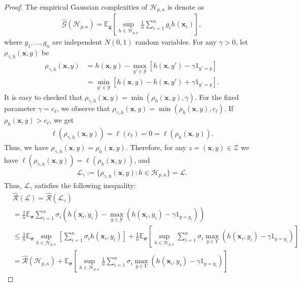 \documentclass{article}
\begin{document}
\begin{proof}
The empirical Gaussian complexities of $\mathcal{H}_{p,\kappa}$ is denote as
\begin{align*}
  \hat{\mathcal{G}}(\mathcal{H}_{p,\kappa})=\mathbb{E}_{\bm g}\left[\sup_{h\in \mathcal{H}_{p,\kappa}}\frac{1}{n}\sum_{i=1}^ng_{i}h(\mathbf x_i)\right],
\end{align*}
where $g_1,\ldots, g_n$ are independent $N(0,1)$ random variables.
For any $\gamma>0$, let  $\rho_{\gamma,h}(\mathbf x,y)$ be
  \begin{align*}
    \rho_{\gamma,h}(\mathbf x,y)&=h(\mathbf x,y)-\max_{y'\in\mathcal{Y}}[h(\mathbf x,y')-\gamma1_{y'=y}]\\
    &=\min_{y'\in\mathcal{Y}}[h(\mathbf x,y)-h(\mathbf x,y')+\gamma1_{y'=y}].
  \end{align*}
  It is easy to checked that $\rho_{\gamma,h}(\mathbf x,y)=\min(\rho_h(\mathbf x,y),\gamma)$.
  For the fixed parameter $\gamma=c_\ell$, we observe that $\rho_{\gamma,h}(\mathbf x,y)=\min(\rho_h(\mathbf x,y),c_\ell)$.
  If $\rho_h(\mathbf x,y)>c_\ell$,
  we get
  \begin{align*}
    \ell(\rho_{\gamma,h}(\mathbf x,y))=\ell(c_\ell)=0=\ell(\rho_h(\mathbf x,y)).
  \end{align*}
  Thus, we have $\rho_{\gamma,h}(\mathbf x,y)=\rho_h(\mathbf x,y)$.
  Therefore, for any $z=(\mathbf x,y)\in\mathcal{Z}$ we have $\ell(\rho_{\gamma,h}(\mathbf x,y))=\ell(\rho_h(\mathbf x,y))$,
  and
  \begin{align*}
    \mathcal{L}_\gamma:=\{\rho_{\gamma,h}(\mathbf x,y):h\in\mathcal{H}_{p,\kappa}\}=\mathcal{L}.
  \end{align*}
  Thus,  $\mathcal{L}_\gamma$ satisfies the following inequality:
  \begin{align*}
    &\hat{\mathcal{R}}(\mathcal{L})=\hat{\mathcal{R}}(\mathcal{L}_\gamma)\\&=\frac{1}{n}\mathbb{E}_{\bm \sigma}
        \sum_{i=1}^n\sigma_i\left(h(\mathbf x_i,y_i)-\max_{y\in\mathcal{Y}}(h(\mathbf x_i,y_i)-\gamma 1_{y=y_i})\right)\\
    &\leq\frac{1}{n}\mathbb{E}_{\bm \sigma}\sup_{h\in\mathcal{H}_{p,\kappa}}\left[\sum_{i=1}^n\sigma_ih(\mathbf x_i,y_i)\right]+
    \frac{1}{n}\mathbb{E}_{\bm \sigma}\left[\sup_{h\in\mathcal{H}_{p,\kappa}}\sum_{i=1}^n\sigma_i\max_{y\in Y}(h(\mathbf x_i,y_i)-\gamma 1_{y=y_i})\right]\\
    &=\hat{\mathcal{R}}(\mathcal{H}_{p,\kappa})+\mathbb{E}_{\bm \sigma}\left[\sup_{h\in\mathcal{H}_{p,\kappa}}\frac{1}{n}\sum_{i=1}^n\sigma_i\max_{y\in Y}(h(\mathbf x_i,y_i)-\gamma 1_{y=y_i})\right]

\end{align*}
\end{proof}
\end{document}
